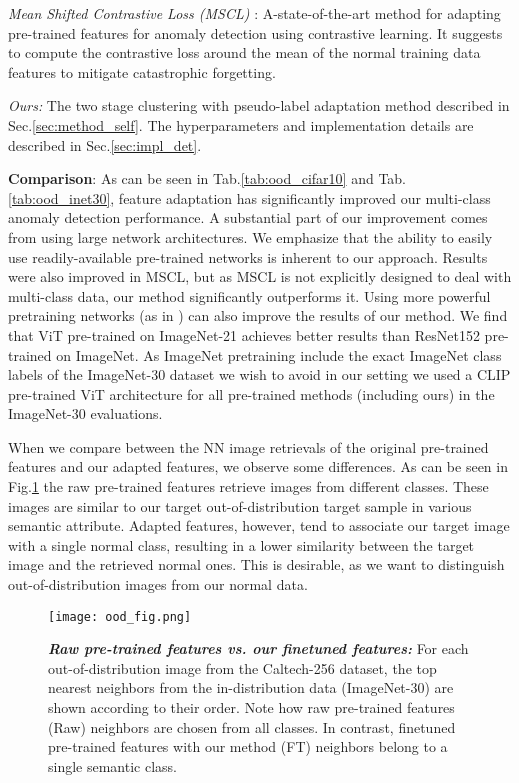 \documentclass[runningheads]{llncs}
\begin{document}
\textit{Mean Shifted Contrastive Loss (MSCL)} \cite{reiss2021mean}: A-state-of-the-art method for adapting pre-trained features for anomaly detection using contrastive learning. It suggests to compute the contrastive loss around the mean of the normal training data features to mitigate catastrophic forgetting.

\textit{Ours:} The two stage clustering with pseudo-label adaptation method described in Sec.\ref{sec:method_self}. The hyperparameters and implementation details are described in Sec.\ref{sec:impl_det}.




\textbf{Comparison}: As can be seen in Tab.\ref{tab:ood_cifar10} and Tab.\ref{tab:ood_inet30}, feature adaptation has significantly improved our multi-class anomaly detection performance. A substantial part of our improvement comes from using large network architectures. We emphasize that the ability to easily use readily-available pre-trained networks is inherent to our approach.
Results were also improved in MSCL, but as MSCL is not explicitly designed to deal with multi-class data, our method significantly outperforms it. Using more powerful pretraining networks (as in \cite{fort2021exploring}) can also improve the results of our method. We find that ViT \cite{dosovitskiy2020image} pre-trained on ImageNet-21 \cite{kolesnikov2020big} achieves better results than ResNet152 pre-trained on ImageNet.
As ImageNet pretraining include the exact ImageNet class labels of the ImageNet-30 dataset we wish to avoid in our setting we used a CLIP \cite{radford2021learning} pre-trained ViT architecture for all pre-trained methods (including ours) in the ImageNet-30 evaluations.

When we compare between the NN image retrievals of the original pre-trained features and our adapted features, we observe some differences. As can be seen in Fig.\ref{fig:nn_images} the raw pre-trained features retrieve images from different classes. These images are similar to our target out-of-distribution target sample in various semantic attribute. Adapted features, however, tend to associate our target image with a single normal class, resulting in a lower similarity between the target image and the retrieved normal ones. This is desirable, as we want to distinguish out-of-distribution images from our normal data.


\begin{figure}[t]
\centering
    \texttt{[image: ood\_fig.png]}


\caption{\textit{\textbf{Raw pre-trained features vs. our finetuned features:}} For each out-of-distribution  image from the Caltech-256 dataset, the top  nearest neighbors from the in-distribution data (ImageNet-30) are shown according to their order. Note how raw pre-trained features (Raw) neighbors are chosen from all classes. In contrast, finetuned pre-trained features with our method (FT) neighbors belong to a single semantic class.}
\label{fig:nn_images}
\end{figure}
\end{document}
